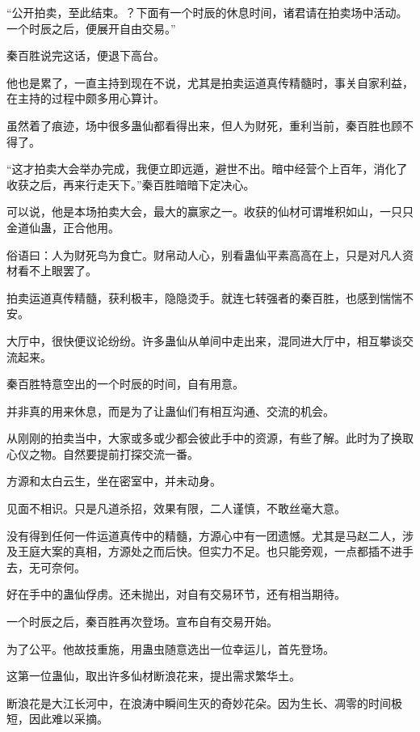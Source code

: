 
\begin{this_body}



“公开拍卖，至此结束。？下面有一个时辰的休息时间，诸君请在拍卖场中活动。一个时辰之后，便展开自由交易。”

秦百胜说完这话，便退下高台。

他也是累了，一直主持到现在不说，尤其是拍卖运道真传精髓时，事关自家利益，在主持的过程中颇多用心算计。

虽然着了痕迹，场中很多蛊仙都看得出来，但人为财死，重利当前，秦百胜也顾不得了。

“这才拍卖大会举办完成，我便立即远遁，避世不出。暗中经营个上百年，消化了收获之后，再来行走天下。”秦百胜暗暗下定决心。

可以说，他是本场拍卖大会，最大的赢家之一。收获的仙材可谓堆积如山，一只只金道仙蛊，正合他用。

俗语曰：人为财死鸟为食亡。财帛动人心，别看蛊仙平素高高在上，只是对凡人资材看不上眼罢了。

拍卖运道真传精髓，获利极丰，隐隐烫手。就连七转强者的秦百胜，也感到惴惴不安。

大厅中，很快便议论纷纷。许多蛊仙从单间中走出来，混同进大厅中，相互攀谈交流起来。

秦百胜特意空出的一个时辰的时间，自有用意。

并非真的用来休息，而是为了让蛊仙们有相互沟通、交流的机会。

从刚刚的拍卖当中，大家或多或少都会彼此手中的资源，有些了解。此时为了换取心仪之物。自然要提前打探交流一番。

方源和太白云生，坐在密室中，并未动身。

见面不相识。只是凡道杀招，效果有限，二人谨慎，不敢丝毫大意。

没有得到任何一件运道真传中的精髓，方源心中有一团遗憾。尤其是马赵二人，涉及王庭大案的真相，方源处之而后快。但实力不足。也只能旁观，一点都插不进手去，无可奈何。

好在手中的蛊仙俘虏。还未抛出，对自有交易环节，还有相当期待。

一个时辰之后，秦百胜再次登场。宣布自有交易开始。

为了公平。他故技重施，用蛊虫随意选出一位幸运儿，首先登场。

这第一位蛊仙，取出许多仙材断浪花来，提出需求繁华土。

断浪花是大江长河中，在浪涛中瞬间生灭的奇妙花朵。因为生长、凋零的时间极短，因此难以采摘。


\end{this_body}
